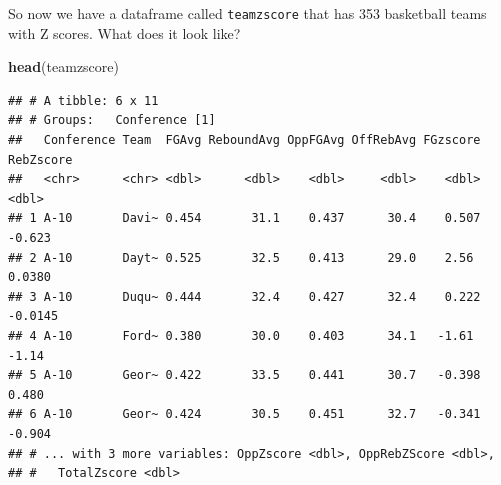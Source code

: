 \documentclass[]{book}
\newenvironment{Shaded}{\begin{snugshade}}{\end{snugshade}}
\newcommand{\DataTypeTok}[1]{\textcolor[rgb]{0.13,0.29,0.53}{#1}}
\newcommand{\DecValTok}[1]{\textcolor[rgb]{0.00,0.00,0.81}{#1}}
\newcommand{\KeywordTok}[1]{\textcolor[rgb]{0.13,0.29,0.53}{\textbf{#1}}}
\newcommand{\NormalTok}[1]{#1}
\newcommand{\OperatorTok}[1]{\textcolor[rgb]{0.81,0.36,0.00}{\textbf{#1}}}
\newcommand{\OtherTok}[1]{\textcolor[rgb]{0.56,0.35,0.01}{#1}}
\newcommand{\StringTok}[1]{\textcolor[rgb]{0.31,0.60,0.02}{#1}}
\begin{document}
\begin{Shaded}
\end{Shaded}

So now we have a dataframe called \texttt{teamzscore} that has 353 basketball teams with Z scores. What does it look like?

\begin{Shaded}
\begin{Highlighting}[]
\KeywordTok{head}\NormalTok{(teamzscore)}
\end{Highlighting}
\end{Shaded}

\begin{verbatim}
## # A tibble: 6 x 11
## # Groups:   Conference [1]
##   Conference Team  FGAvg ReboundAvg OppFGAvg OffRebAvg FGzscore RebZscore
##   <chr>      <chr> <dbl>      <dbl>    <dbl>     <dbl>    <dbl>     <dbl>
## 1 A-10       Davi~ 0.454       31.1    0.437      30.4    0.507   -0.623 
## 2 A-10       Dayt~ 0.525       32.5    0.413      29.0    2.56     0.0380
## 3 A-10       Duqu~ 0.444       32.4    0.427      32.4    0.222   -0.0145
## 4 A-10       Ford~ 0.380       30.0    0.403      34.1   -1.61    -1.14  
## 5 A-10       Geor~ 0.422       33.5    0.441      30.7   -0.398    0.480 
## 6 A-10       Geor~ 0.424       30.5    0.451      32.7   -0.341   -0.904 
## # ... with 3 more variables: OppZscore <dbl>, OppRebZScore <dbl>,
## #   TotalZscore <dbl>
\end{verbatim}
\end{document}
